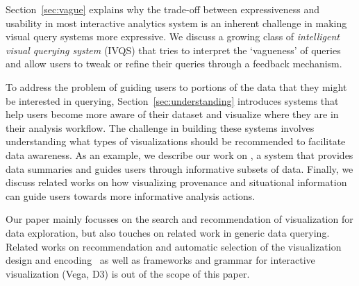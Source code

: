 \par Section~\ref{sec:vague} explains why the trade-off between expressiveness and usability in most interactive analytics system is an inherent challenge in making visual query systems more expressive. We discuss a growing class of \textit{intelligent visual querying system} (IVQS) that tries to interpret the `vagueness' of queries and allow users to tweak or refine their queries through a feedback mechanism.
\par To address the problem of guiding users to portions of the data that they might be interested in querying, Section~\ref{sec:understanding} introduces systems that help users become more aware of their dataset and visualize where they are in their analysis workflow. The challenge in building these systems involves understanding what types of visualizations should be recommended to facilitate data awareness. As an example, we describe our work on \sbd, a system that provides data summaries and guides users through informative subsets of data. Finally, we discuss related works on how visualizing provenance and situational information can guide users towards more informative analysis actions.
\par Our paper mainly focusses on the search and recommendation of visualization for data exploration, but also touches on related work in generic data querying. Related works on recommendation and automatic selection of the visualization design and encoding~\cite{Wongsuphasawat2017,Mackinlay2007} as well as frameworks and grammar for interactive visualization (Vega, D3) is out of the scope of this paper.

